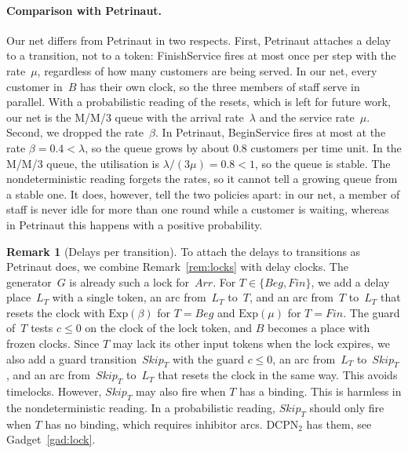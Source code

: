 \documentclass[11pt]{article}
\theoremstyle{definition}
\newcommand{\DCPN}[1]{\texorpdfstring{\textup{DCPN}\ensuremath{_{#1}}}{DCPN#1}}
\newtheorem{remark}{Remark}
\begin{document}
\paragraph{Comparison with Petrinaut.}
Our net differs from Petrinaut in two respects. First, Petrinaut attaches a
delay to a transition, not to a token: FinishService fires at most once per
step with the rate~$\mu$, regardless of how many customers are being served.
In our net, every customer in~$B$ has their own clock, so the three members
of staff serve in parallel. With a probabilistic reading of the resets,
which is left for future work, our net is the M/M/3 queue with the arrival
rate~$\lambda$ and the service rate~$\mu$. Second, we dropped the
rate~$\beta$. In Petrinaut, BeginService fires at most at the rate
$\beta = 0.4 < \lambda$, so the queue grows by about $0.8$ customers per time
unit. In the M/M/3 queue, the utilisation is $\lambda / (3\mu) = 0.8 < 1$,
so the queue is stable. The nondeterministic reading forgets the rates, so
it cannot tell a growing queue from a stable one. It does, however, tell the
two policies apart: in our net, a member of staff is never idle for more
than one round while a customer is waiting, whereas in Petrinaut this
happens with a positive probability.

\begin{remark}[Delays per transition]\label{rem:cafe-locks}
  To attach the delays to transitions as Petrinaut does, we combine
  Remark~\ref{rem:locks} with delay clocks. The generator~$G$ is already
  such a lock for~$\mathit{Arr}$. For $T \in \{\mathit{Beg},
  \mathit{Fin}\}$, we add a delay place~$L_T$ with a single token, an arc
  from~$L_T$ to~$T$, and an arc from~$T$ to~$L_T$ that resets the clock with
  $\mathrm{Exp}(\beta)$ for $T = \mathit{Beg}$ and $\mathrm{Exp}(\mu)$ for
  $T = \mathit{Fin}$. The guard of~$T$ tests $c \le 0$ on the clock of the
  lock token, and $B$ becomes a place with frozen clocks. Since $T$ may lack
  its other input tokens when the lock expires, we also add a guard
  transition~$\mathit{Skip}_T$ with the guard $c \le 0$, an arc from~$L_T$
  to~$\mathit{Skip}_T$, and an arc from~$\mathit{Skip}_T$ to~$L_T$ that
  resets the clock in the same way. This avoids timelocks. However,
  $\mathit{Skip}_T$ may also fire when $T$ has a binding. This is harmless in
  the nondeterministic reading. In a probabilistic reading,
  $\mathit{Skip}_T$ should only fire when $T$ has no binding, which requires
  inhibitor arcs. \DCPN{2} has them, see Gadget~\ref{gad:lock}.
\end{remark}
\end{document}
